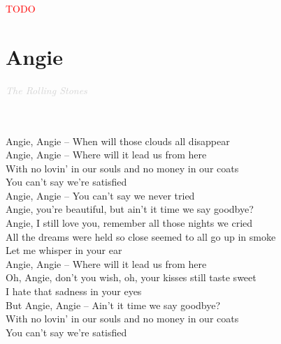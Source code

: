 \documentclass[a5paper, 10pt]{book}
\begin{document}
\begin{minipage}[t]{0.2\textwidth}
\textcolor{red}{TODO}\\
\end{minipage}

\newpage
\section{Angie }\textcolor{lightgray}{\textit{The Rolling Stones}}\\~\\
\begin{minipage}[t]{0.8\textwidth}
~ \\
Angie, Angie – When will those clouds all disappear\\
Angie, Angie – Where will it lead us from here\\

\hspace*{2mm} With no lovin' in our souls and no money in our coats\\
\hspace*{2mm} You can't say we're satisfied\\

Angie, Angie – You can't say we never tried\\

Angie, you're beautiful, but ain't it time we say goodbye?\\
Angie, I still love you, remember all those nights we cried\\

\hspace*{2mm} All the dreams were held so close seemed to all go up in smoke\\
\hspace*{2mm} Let me whisper in your ear\\

Angie, Angie – Where will it lead us from here\\

\hspace*{2mm} Oh, Angie, don't you wish, oh, your kisses still taste sweet\\
\hspace*{2mm} I hate that sadness in your eyes\\

But Angie, Angie – Ain't it time we say goodbye?\\

\hspace*{2mm} With no lovin' in our souls and no money in our coats\\
\hspace*{2mm} You can't say we're satisfied\\


\end{minipage}
\end{document}

